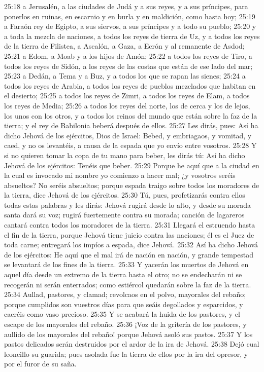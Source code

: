 25:18 a Jerusalén, a las ciudades de Judá y a sus reyes, y a sus príncipes, para ponerlos en ruinas, en escarnio y en burla y en maldición, como hasta hoy; 
25:19 a Faraón rey de Egipto, a sus siervos, a sus príncipes y a todo su pueblo; 
25:20 y a toda la mezcla de naciones, a todos los reyes de tierra de Uz, y a todos los reyes de la tierra de Filistea, a Ascalón, a Gaza, a Ecrón y al remanente de Asdod; 
25:21 a Edom, a Moab y a los hijos de Amón; 
25:22 a todos los reyes de Tiro, a todos los reyes de Sidón, a los reyes de las costas que están de ese lado del mar; 
25:23 a Dedán, a Tema y a Buz, y a todos los que se rapan las sienes; 
25:24 a todos los reyes de Arabia, a todos los reyes de pueblos mezclados que habitan en el desierto; 
25:25 a todos los reyes de Zimri, a todos los reyes de Elam, a todos los reyes de Media; 
25:26 a todos los reyes del norte, los de cerca y los de lejos, los unos con los otros, y a todos los reinos del mundo que están sobre la faz de la tierra; y el rey de Babilonia beberá después de ellos. 
25:27 Les dirás, pues: Así ha dicho Jehová de los ejércitos, Dios de Israel: Bebed, y embriagaos, y vomitad, y caed, y no os levantéis, a causa de la espada que yo envío entre vosotros. 
25:28 Y si no quieren tomar la copa de tu mano para beber, les dirás tú: Así ha dicho Jehová de los ejércitos: Tenéis que beber. 
25:29 Porque he aquí que a la ciudad en la cual es invocado mi nombre yo comienzo a hacer mal; ¿y vosotros seréis absueltos? No seréis absueltos; porque espada traigo sobre todos los moradores de la tierra, dice Jehová de los ejércitos. 
25:30 Tú, pues, profetizarás contra ellos todas estas palabras y les dirás: Jehová rugirá desde lo alto, y desde su morada santa dará su voz; rugirá fuertemente contra su morada; canción de lagareros cantará contra todos los moradores de la tierra. 
25:31 Llegará el estruendo hasta el fin de la tierra, porque Jehová tiene juicio contra las naciones; él es el Juez de toda carne; entregará los impíos a espada, dice Jehová. 
25:32 Así ha dicho Jehová de los ejércitos: He aquí que el mal irá de nación en nación, y grande tempestad se levantará de los fines de la tierra. 
25:33 Y yacerán los muertos de Jehová en aquel día desde un extremo de la tierra hasta el otro; no se endecharán ni se recogerán ni serán enterrados; como estiércol quedarán sobre la faz de la tierra. 
25:34 Aullad, pastores, y clamad; revolcaos en el polvo, mayorales del rebaño; porque cumplidos son vuestros días para que seáis degollados y esparcidos, y caeréis como vaso precioso. 
25:35 Y se acabará la huida de los pastores, y el escape de los mayorales del rebaño. 
25:36 ¡Voz de la gritería de los pastores, y aullido de los mayorales del rebaño! porque Jehová asoló sus pastos. 
25:37 Y los pastos delicados serán destruidos por el ardor de la ira de Jehová. 
25:38 Dejó cual leoncillo su guarida; pues asolada fue la tierra de ellos por la ira del opresor, y por el furor de su saña. 

